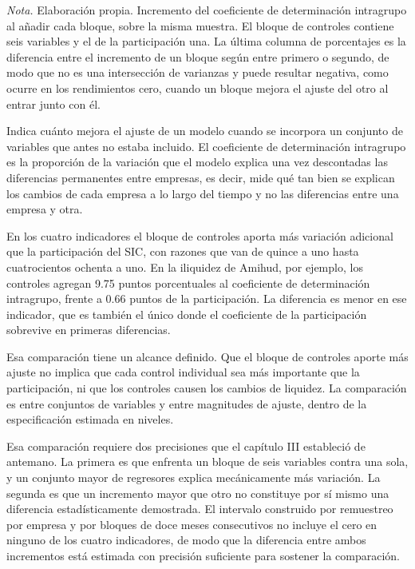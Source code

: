 \emph{Nota.} Elaboración propia. Incremento del coeficiente de determinación intragrupo al añadir cada bloque, sobre la misma muestra.  El bloque de controles contiene seis variables y el de la participación una. La última columna de porcentajes es la diferencia entre el incremento de un bloque según entre primero o segundo, de modo que no es una intersección de varianzas y puede resultar negativa, como ocurre en los rendimientos cero, cuando un bloque mejora el ajuste del otro al entrar junto con él.

Indica cuánto mejora el ajuste de un modelo cuando se incorpora un conjunto de variables que antes no estaba incluido. El coeficiente de determinación intragrupo es la proporción de la variación que el modelo explica una vez descontadas las diferencias permanentes entre empresas, es decir, mide qué tan bien se explican los cambios de cada empresa a lo largo del tiempo y no las diferencias entre una empresa y otra.

En los cuatro indicadores el bloque de controles aporta más variación adicional que la participación del SIC, con razones que van de quince a uno hasta cuatrocientos ochenta a uno. En la iliquidez de Amihud, por ejemplo, los controles agregan 9.75 puntos porcentuales al coeficiente de determinación intragrupo, frente a 0.66 puntos de la participación. La diferencia es menor en ese indicador, que es también el único donde el coeficiente de la participación sobrevive en primeras diferencias.

Esa comparación tiene un alcance definido. Que el bloque de controles aporte más ajuste no implica que cada control individual sea más importante que la participación, ni que los controles causen los cambios de liquidez. La comparación es entre conjuntos de variables y entre magnitudes de ajuste, dentro de la especificación estimada en niveles.

Esa comparación requiere dos precisiones que el capítulo III estableció de antemano. La primera es que enfrenta un bloque de seis variables contra una sola, y un conjunto mayor de regresores explica mecánicamente más variación. La segunda es que un incremento mayor que otro no constituye por sí mismo una diferencia estadísticamente demostrada. El intervalo construido por remuestreo por empresa y por bloques de doce meses consecutivos no incluye el cero en ninguno de los cuatro indicadores, de modo que la diferencia entre ambos incrementos está estimada con precisión suficiente para sostener la comparación.

